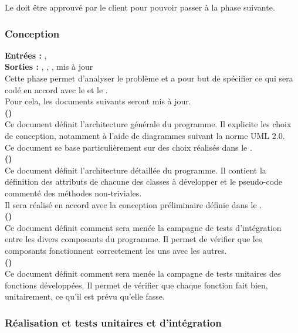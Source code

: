 Le \DSECourt{} doit être approuvé par le client pour pouvoir passer à la phase suivante. \\


\subsubsection{Conception}

\textbf{Entrées :} \DSECourt, \DSICourt \\
\textbf{Sorties :} \DCPCourt , \DCDCourt , \PTICourt , \PTUCourt mis à jour\\
Cette phase permet d’analyser le problème et a pour but de spécifier ce qui sera codé en accord avec le \DSECourt{} et le \DSICourt. \\
Pour cela, les documents suivants seront mis à jour. \\

\textbf{\DCP (\DCPCourt)} \\
Ce document définit l’architecture générale du programme. Il explicite les choix de conception, notamment à l’aide de diagrammes suivant la norme UML 2.0.\\ 
Ce document se base particulièrement sur des choix réalisés dans le \DSICourt. \\

\textbf{\DCD (\DCDCourt)} \\
Ce document définit l’architecture détaillée du programme. Il contient la définition des attributs de chacune des classes à développer et le pseudo-code commenté des méthodes non-triviales.\\
Il sera réalisé en accord avec la conception préliminaire définie dans le \DCPCourt.\\
\textbf{\PTI (\PTICourt)} \\
Ce document définit comment sera menée la campagne de tests d’intégration entre les divers composants du programme. Il permet de vérifier que les composants fonctionnent correctement les uns avec les autres.\\

\textbf{\PTU (\PTUCourt)} \\

Ce document définit comment sera menée la campagne de tests unitaires des fonctions développées. Il permet de vérifier que chaque fonction fait bien, unitairement, ce qu’il est prévu qu’elle fasse. \\


\subsubsection{Réalisation et tests unitaires et d’intégration}

